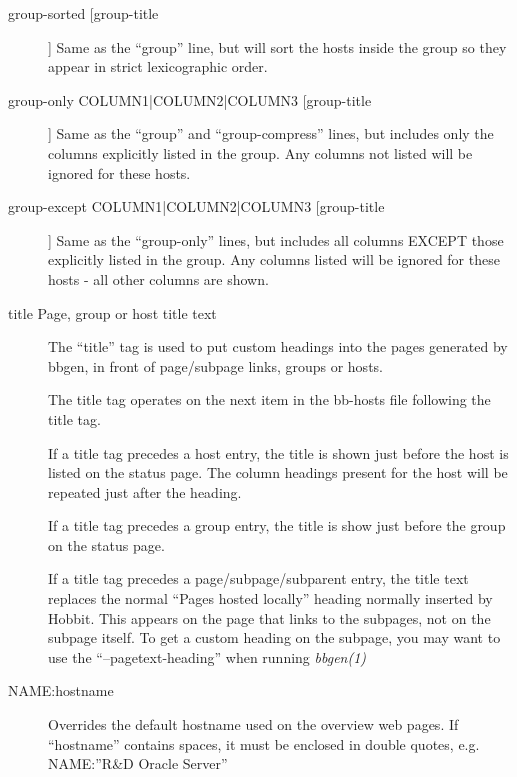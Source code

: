 \begin{description}
 

\item[group-sorted [group-title]] Same as the ``group'' line, but will
  sort the hosts inside the group so they appear in strict
  lexicographic order. 


 

\item[group-only COLUMN1|COLUMN2|COLUMN3 [group-title]] Same as the
  ``group'' and ``group-compress'' lines, but includes only the
  columns explicitly listed in the group. Any columns not listed will
  be ignored for these hosts. 


 

\item[group-except COLUMN1|COLUMN2|COLUMN3 [group-title]] Same as the
  ``group-only'' lines, but includes all columns EXCEPT those
  explicitly listed in the group. Any columns listed will be ignored
  for these hosts - all other columns are shown. 


 

\item[title Page, group or host title text] The ``title'' tag is used
  to put custom headings into the pages generated by bbgen, in front
  of page/subpage links, groups or hosts. 


  The title tag operates on the next item in the bb-hosts file following the title tag. 


  If a title tag precedes a host entry, the title is shown just before
  the host is listed on the status page. The column headings present
  for the host will be repeated just after the heading. 



  If a title tag precedes a group entry, the title is show just before the group on the status page. 


  If a title tag precedes a page/subpage/subparent entry, the title
  text replaces the normal ``Pages hosted locally'' heading normally
  inserted by Hobbit. This appears on the page that links to the
  subpages, not on the subpage itself. To get a custom heading on the
  subpage, you may want to use the ``--pagetext-heading'' when running
  \emph{bbgen(1)}




 

\item[NAME:hostname] Overrides the default hostname used on the
  overview web pages. If ``hostname'' contains spaces, it must be
  enclosed in double quotes, e.g. NAME:''R\&D Oracle Server'' 



\end{description}
